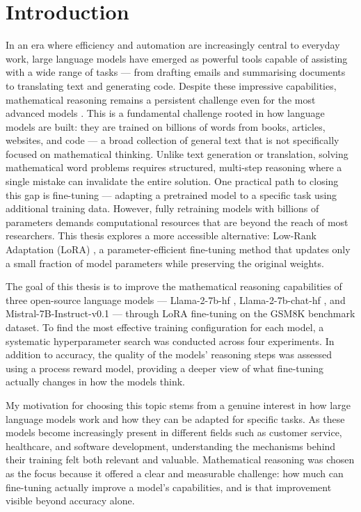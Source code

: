 
% 
\chapter{Introduction}
\label{chap:introduction}
In an era where efficiency and automation are
  increasingly central to everyday work, large
  language models have emerged as powerful tools
  capable of assisting with a wide range of tasks
  --- from drafting emails and summarising documents  to translating text
  and generating code. Despite these impressive capabilities,
  mathematical reasoning remains a persistent
  challenge even for the most advanced models \cite{hendrycks2021}.
  This is a fundamental challenge rooted in how
  language models are built: they are trained on
  billions of words from books, articles,
  websites, and code --- a broad collection of
  general text that is not specifically focused
  on mathematical thinking.
  Unlike text generation or translation, solving
  mathematical word problems requires structured,
  multi-step reasoning where a single mistake
  can invalidate the entire solution. One
  practical path to closing this gap is
  fine-tuning --- adapting a pretrained model to a
  specific task using additional training data.
  However, fully retraining models with billions
  of parameters demands computational resources
  that are beyond the reach of most researchers.
  This thesis explores a more accessible
  alternative: Low-Rank Adaptation (LoRA) \cite{hu2022lora}, a
  parameter-efficient fine-tuning method that
  updates only a small fraction of model parameters
  while preserving the original weights.

  The goal of this thesis is to improve the
  mathematical reasoning capabilities of three
  open-source language models --- Llama-2-7b-hf \cite{touvron2023},
  Llama-2-7b-chat-hf \cite{touvron2023}, and Mistral-7B-Instruct-v0.1 \cite{jiang2023}
  --- through LoRA fine-tuning on the GSM8K \cite{cobbe2021}
  benchmark dataset. To find the most effective
  training configuration for each model, a
  systematic hyperparameter search was conducted
  across four experiments. In addition to
  accuracy, the quality of the models' reasoning
  steps was assessed using a process reward model,
  providing a deeper view of what fine-tuning
  actually changes in how the models think.

  My motivation for choosing this topic stems
  from a genuine interest in how large language
  models work and how they can be adapted for
  specific tasks. As these models become
  increasingly present in different fields such as customer
  service, healthcare, and software development,
  understanding the mechanisms behind their
  training felt both relevant and valuable.
  Mathematical reasoning was chosen as the focus
  because it offered a clear and measurable
  challenge: how much can fine-tuning actually
  improve a model's capabilities, and is that
  improvement visible beyond accuracy alone.

